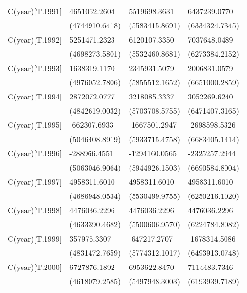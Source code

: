 \begin{table}
\begin{center}
\begin{tabular}{llll}
C(year)[T.1991]          & 4651062.2604      & 5519698.3631      & 6437239.0770        \\
                         & (4744910.6418)    & (5583415.8691)    & (6334324.7345)      \\
C(year)[T.1992]          & 5251471.2323      & 6120107.3350      & 7037648.0489        \\
                         & (4698273.5801)    & (5532460.8681)    & (6273384.2152)      \\
C(year)[T.1993]          & 1638319.1170      & 2345931.5079      & 2006831.0579        \\
                         & (4976052.7806)    & (5855512.1652)    & (6651000.2859)      \\
C(year)[T.1994]          & 2872072.0777      & 3218085.3337      & 3052269.6240        \\
                         & (4842619.0032)    & (5703708.5755)    & (6471407.3165)      \\
C(year)[T.1995]          & -662307.6933      & -1667501.2947     & -2698598.5326       \\
                         & (5046408.8919)    & (5933715.4758)    & (6683405.1414)      \\
C(year)[T.1996]          & -288966.4551      & -1294160.0565     & -2325257.2944       \\
                         & (5063046.9064)    & (5944926.1503)    & (6690584.8004)      \\
C(year)[T.1997]          & 4958311.6010      & 4958311.6010      & 4958311.6010        \\
                         & (4686948.0534)    & (5530499.9755)    & (6250216.1020)      \\
C(year)[T.1998]          & 4476036.2296      & 4476036.2296      & 4476036.2296        \\
                         & (4633390.4682)    & (5500606.9570)    & (6224784.8082)      \\
C(year)[T.1999]          & 357976.3307       & -647217.2707      & -1678314.5086       \\
                         & (4831472.7659)    & (5774312.1017)    & (6493913.0748)      \\
C(year)[T.2000]          & 6727876.1892      & 6953622.8470      & 7114483.7346        \\
                         & (4618079.2585)    & (5497948.3003)    & (6193939.7189)      \\

\end{tabular}
\end{center}
\end{table}
